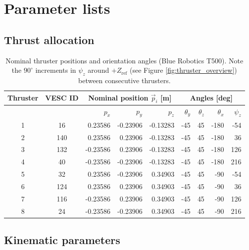 \section{Parameter lists}

\subsection{Thrust allocation} \label{appendix:thrustalloc}

\begin{table}[h!]
\centering
\caption{Nominal thruster positions and orientation angles (Blue Robotics T500). 
Note the $90^\circ$ increments in $\psi_z$ around $+\!Z_{\mathrm{ref}}$ (see Figure \ref{fig:thruster_overview}) between consecutive thrusters.}
\begin{tabular}{c|c|rrr|rrrr}
\toprule
Thruster & VESC ID & \multicolumn{3}{c|}{Nominal position $\vec{p}_i$ [m]} &
\multicolumn{4}{c}{Angles [deg]}\\
\midrule
 &  & $p_x$ & $p_y$ & $p_z$ &
 $\theta_y$ & $\theta_z$ & $\theta_x$ & $\psi_z$ \\
\midrule
1 & 16  &  0.23586 & -0.23906 & -0.13283 & -45 & 45 & -180 &  -54 \\
2 & 140 &  0.23586 &  0.23906 & -0.13283 & -45 & 45 & -180 &   36 \\
3 & 132 & -0.23586 &  0.23906 & -0.13283 & -45 & 45 & -180 &  126 \\
4 & 40  & -0.23586 & -0.23906 & -0.13283 & -45 & 45 & -180 &  216 \\
5 & 32  &  0.23586 & -0.23906 &  0.34903 & -45 & 45 &  -90 &  -54 \\
6 & 124 &  0.23586 &  0.23906 &  0.34903 & -45 & 45 &  -90 &   36 \\
7 & 116 & -0.23586 &  0.23906 &  0.34903 & -45 & 45 &  -90 &  126 \\
8 & 24  & -0.23586 & -0.23906 &  0.34903 & -45 & 45 &  -90 &  216 \\
\bottomrule
\end{tabular}
\label{tab:thruster_pose_nominal_vesc}
\end{table}

\subsection{Kinematic parameters}

